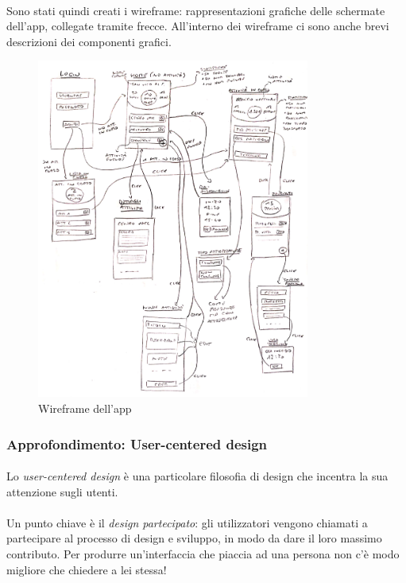 \documentclass[11pt,a4paper,english]{article}
\begin{document}
\paragraph{} Sono stati quindi creati i wireframe: rappresentazioni grafiche delle schermate dell'app, collegate tramite frecce. All'interno dei wireframe ci sono anche brevi descrizioni dei componenti grafici.

\begin{figure}[H]
    \centering
    \includegraphics[width=0.8\textwidth]{img/wireframe app.pdf}
    \caption{Wireframe dell'app}
\end{figure}



\subsubsection{Approfondimento: User-centered design}

\paragraph{} Lo \emph{user-centered design} è una particolare filosofia di design che incentra la sua attenzione sugli utenti.

\paragraph{} Un punto chiave è il \emph{design partecipato}: gli utilizzatori vengono chiamati a partecipare al processo di design e sviluppo, in modo da dare il loro massimo contributo. Per produrre un'interfaccia che piaccia ad una persona non c'è modo migliore che chiedere a lei stessa!
\end{document}
